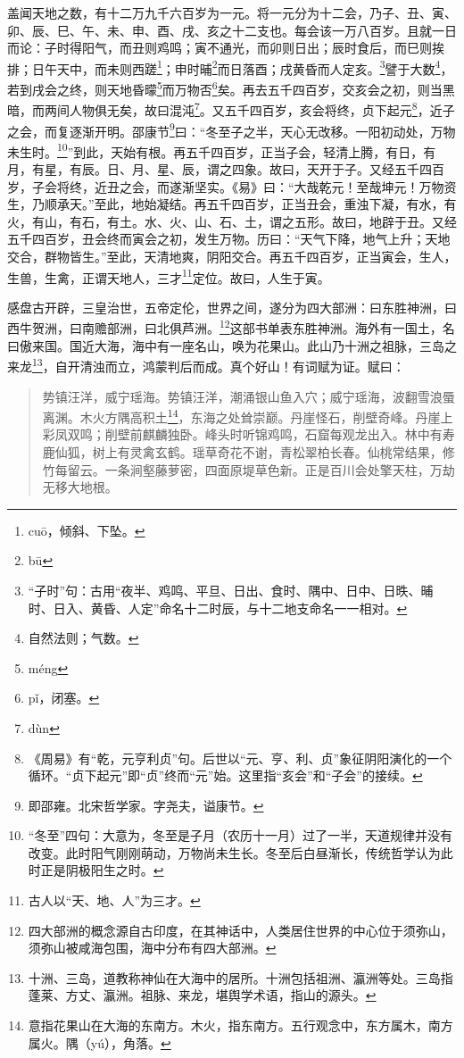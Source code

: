 \documentclass[12pt,UTF8]{ctexbook}
\begin{document}
盖闻天地之数，有十二万九千六百岁为一元。将一元分为十二会，乃子、丑、寅、卯、辰、巳、午、未、申、酉、戌、亥之十二支也。每会该一万八百岁。且就一日而论：子时得阳气，而丑则鸡鸣；寅不通光，而卯则日出；辰时食后，而巳则挨排；日午天中，而未则西蹉\footnote{cu\=o，倾斜、下坠。}；申时晡\footnote{b\=u}而日落酉；戌黄昏而人定亥。\footnote{“子时”句：古用“夜半、鸡鸣、平旦、日出、食时、隅中、日中、日昳、晡时、日入、黄昏、人定”命名十二时辰，与十二地支命名一一相对。}譬于大数\footnote{自然法则；气数。}，若到戌会之终，则天地昏曚\footnote{m\'eng}而万物否\footnote{p\v{i}，闭塞。}矣。再去五千四百岁，交亥会之初，则当黑暗，而两间人物俱无矣，故曰混沌\footnote{d\`un}。又五千四百岁，亥会将终，贞下起元\footnote{《周易》有“乾，元亨利贞”句。后世以“元、亨、利、贞”象征阴阳演化的一个循环。“贞下起元”即“贞”终而“元”始。这里指“亥会”和“子会”的接续。}，近子之会，而复逐渐开明。邵康节\footnote{即邵雍。北宋哲学家。字尧夫，谥康节。}曰：“冬至子之半，天心无改移。一阳初动处，万物未生时。\footnote{“冬至”四句：大意为，冬至是子月（农历十一月）过了一半，天道规律并没有改变。此时阳气刚刚萌动，万物尚未生长。冬至后白昼渐长，传统哲学认为此时正是阴极阳生之时。}”到此，天始有根。再五千四百岁，正当子会，轻清上腾，有日，有月，有星，有辰。日、月、星、辰，谓之四象。故曰，天开于子。又经五千四百岁，子会将终，近丑之会，而遂渐坚实。《易》曰：“大哉乾元！至哉坤元！万物资生，乃顺承天。”至此，地始凝结。再五千四百岁，正当丑会，重浊下凝，有水，有火，有山，有石，有土。水、火、山、石、土，谓之五形。故曰，地辟于丑。又经五千四百岁，丑会终而寅会之初，发生万物。历曰：“天气下降，地气上升；天地交合，群物皆生。”至此，天清地爽，阴阳交合。再五千四百岁，正当寅会，生人，生兽，生禽，正谓天地人，三才\footnote{古人以“天、地、人”为三才。}定位。故曰，人生于寅。

感盘古开辟，三皇治世，五帝定伦，世界之间，遂分为四大部洲：曰东胜神洲，曰西牛贺洲，曰南赡部洲，曰北俱芦洲。\footnote{四大部洲的概念源自古印度，在其神话中，人类居住世界的中心位于须弥山，须弥山被咸海包围，海中分布有四大部洲。}这部书单表东胜神洲。海外有一国土，名曰傲来国。国近大海，海中有一座名山，唤为花果山。此山乃十洲之祖脉，三岛之来龙\footnote{十洲、三岛，道教称神仙在大海中的居所。十洲包括祖洲、瀛洲等处。三岛指蓬莱、方丈、瀛洲。祖脉、来龙，堪舆学术语，指山的源头。}，自开清浊而立，鸿蒙判后而成。真个好山！有词赋为证。赋曰：

\begin{quotation}
势镇汪洋，威宁瑶海。势镇汪洋，潮涌银山鱼入穴；威宁瑶海，波翻雪浪蜃离渊。木火方隅高积土\footnote{意指花果山在大海的东南方。木火，指东南方。五行观念中，东方属木，南方属火。隅（yú），角落。}，东海之处耸崇巅。丹崖怪石，削壁奇峰。丹崖上彩凤双鸣；削壁前麒麟独卧。峰头时听锦鸡鸣，石窟每观龙出入。林中有寿鹿仙狐，树上有灵禽玄鹤。瑶草奇花不谢，青松翠柏长春。仙桃常结果，修竹每留云。一条涧壑藤萝密，四面原堤草色新。正是百川会处擎天柱，万劫无移大地根。
\end{quotation}
\end{document}
